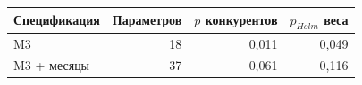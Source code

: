\begin{tabular}{lrrr}
\toprule
Спецификация & Параметров & $p$ конкурентов & $p_{Holm}$ веса \\
\midrule
M3 & 18 & 0,011 & 0,049 \\
M3 + месяцы & 37 & 0,061 & 0,116 \\
\bottomrule
\end{tabular}
